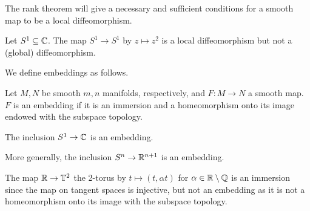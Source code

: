 The rank theorem will give a necessary and sufficient conditions for a smooth map to be a local diffeomorphism. 
\begin{example}
    Let $S^{1}\subseteq\mathbb{C}$. The map $S^{1}\to S^{1}$ by $z\mapsto z^{2}$ is a local diffeomorphism but not a (global) diffeomorphism. 
\end{example}
We define embeddings as follows. 
\begin{definition}\label{def: embedding}
    Let $M,N$ be smooth $m,n$ manifolds, respectively, and $F:M\to N$ a smooth map. $F$ is an embedding if it is an immersion and a homeomorphism onto its image endowed with the subspace topology. 
\end{definition}
\begin{example}
    The inclusion $S^{1}\to\mathbb{C}$ is an embedding. 
\end{example}
\begin{example}
    More generally, the inclusion $S^{n}\to\mathbb{R}^{n+1}$ is an embedding. 
\end{example}
\begin{example}
    The map $\mathbb{R}\to\mathbb{T}^{2}$ the 2-torus by $t\mapsto (t,\alpha t)$ for $\alpha\in\mathbb{R}\setminus\mathbb{Q}$ is an immersion since the map on tangent spaces is injective, but not an embedding as it is not a homeomorphism onto its image with the subspace topology.
\end{example}